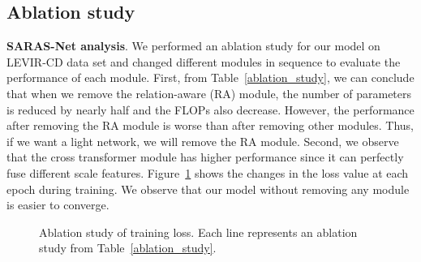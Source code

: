 \documentclass[letterpaper]{article} \usepackage{aaai23}  \usepackage{times}  \usepackage{helvet}  \usepackage{courier}  \usepackage[hyphens]{url}  \usepackage{graphicx} \urlstyle{rm} \def\UrlFont{\rm}  \usepackage{natbib}  \usepackage{caption} \frenchspacing  \setlength{\pdfpagewidth}{8.5in}  \setlength{\pdfpageheight}{11in}  \usepackage{algorithm}
\begin{document}
\subsection{Ablation study}
\textbf{SARAS-Net analysis}. We performed an ablation study for our model on LEVIR-CD data set and changed different modules in sequence to evaluate the performance of each module. First, from Table~\ref{ablation_study}, we can conclude that when we remove the relation-aware (RA) module, the number of parameters is reduced by nearly half and the FLOPs also decrease. However, the performance after removing the RA module is worse than after removing other modules. Thus, if we want a light network, we will remove the RA module. Second, we observe that the cross transformer module has higher performance since it can perfectly fuse different scale features.  Figure~\ref{training_loss} shows the changes in the loss value at each epoch during training.  We observe that our model without removing any module is easier to converge. 








\begin{figure}[h]
\caption{ Ablation study of training loss. Each line represents an ablation study from Table~\ref{ablation_study}.}
\label{training_loss}
\end{figure}

\vspace{0.1cm}
\begin{table}[h]
\caption{ Ablation study of the effects when different modules are added to our model, where RA is the relation-aware module, SA is the scale-aware module, and CT is the cross-transformer module.}
\label{ablation_study}
\end{table}
\end{document}
